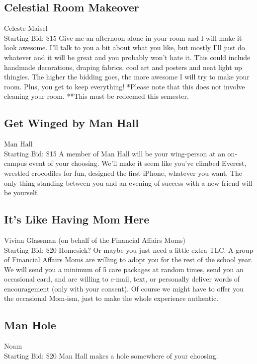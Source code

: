 \documentclass[11pt]{article}
\begin{document}
\subsection{Celestial Room Makeover}
Celeste Maisel
\\
Starting Bid: \$15
\newline
Give me an afternoon alone in your room and I will make it look awesome.  I'll talk to you a bit about what you like, but mostly I'll just do whatever and it will be great and you probably won't hate it.  This could include handmade decorations, draping fabrics,  cool art and posters and neat light up thingies.  The higher the bidding goes, the more awesome I will try to make your room.  Plus, you get to keep everything!
*Please note that this does not involve cleaning your room.
**This must be redeemed this semester.
\subsection{Get Winged by Man Hall}
Man Hall
\\
Starting Bid: \$15
\newline
A member of Man Hall will be your wing-person at an on-campus event of your choosing. We'll make it seem like you've climbed Everest, wrestled crocodiles for fun, designed the first iPhone, whatever you want. The only thing standing between you and an evening of success with a new friend will be yourself.
\subsection{It’s Like Having Mom Here}
Vivian Glassman (on behalf of the Financial Affairs Moms)
\\
Starting Bid: \$20
\newline
Homesick?  Or maybe you just need a little extra TLC.  A group of Financial Affairs Moms are willing to adopt you for the rest of the school year.  We will send you a minimum of 5 care packages at random times, send you an occasional card, and are willing to e-mail, text, or personally deliver words of encouragement (only with your consent).  Of course we might have to offer you the occasional Mom-ism, just to make the whole experience authentic.
\subsection{Man Hole}
Noam
\\
Starting Bid: \$20
\newline
Man Hall makes a hole somewhere of your choosing.
\end{document}
